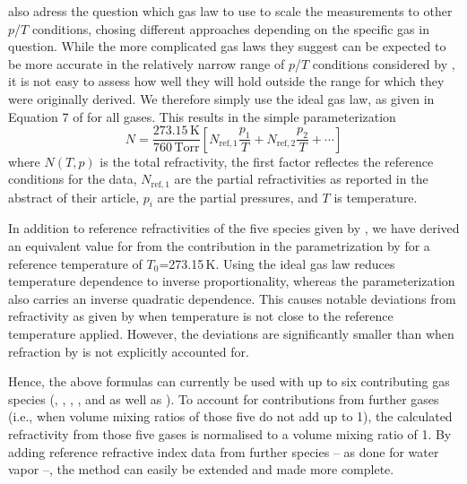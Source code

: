 \citet{newell65:_absolute_jap} also adress the question which gas law
to use to scale the measurements to other $p$/$T$ conditions, chosing different
approaches depending on the specific gas in question. While the more complicated
gas laws they suggest can be expected to be more
accurate in the relatively narrow range of $p$/$T$ conditions
considered by \citet{newell65:_absolute_jap}, it is not easy to
assess how well they will hold outside the range for which they were
originally derived. We therefore simply use the ideal gas
law, as given in Equation 7 of \citet{newell65:_absolute_jap} for all
gases. This results in the simple parameterization
\begin{equation}
  \label{eq:N_density2}
  N = \frac{273.15\,\mathrm{K}}{760\,\mathrm{Torr}}  
           \left[
           N_{\mathrm{ref},1} \frac{p_1}{T} + 
           N_{\mathrm{ref},2} \frac{p_2}{T} + \cdots
           \right]
\end{equation}
where $ N(T,p)$ is the total refractivity, the
first factor reflectes the reference conditions for the
\citet{newell65:_absolute_jap} data, $N_{\mathrm{ref},1}$ are the
partial refractivities as reported in the abstract of their
article, $p_i$ are the partial pressures, and $T$ is temperature.

In addition to reference refractivities of the five species given by
\citet{newell65:_absolute_jap}, we have derived an equivalent value for
 from the  contribution in the parametrization by
\citet{thayer74_improved_rs} for a reference temperature of $T_0$=273.15\,K.
Using the ideal gas law reduces temperature dependence to inverse
proportionality, whereas the \citet{thayer74_improved_rs} parameterization also
carries an inverse quadratic dependence. This causes notable deviations from
 refractivity as given by \citet{thayer74_improved_rs} when
temperature is not close to the reference temperature applied. However, the
deviations are significantly smaller than when refraction by  is not
explicitly accounted for.

Hence, the above formulas can currently be used with up to six contributing gas
species (, , , , and  as well
as ). To account for contributions from further gases
(i.e., when volume mixing ratios of those five do not add up to 1), the
calculated refractivity from those five gases is normalised to a volume mixing
ratio of 1. By adding reference refractive index data from further species -- as
done for water vapor --, the method can easily be extended and made more complete.

